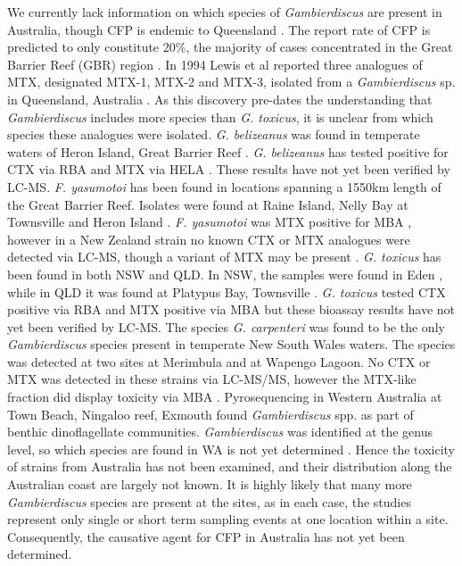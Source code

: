 \documentclass[12pt]{article}
\begin{document}
We currently lack information on which species of \emph{Gambierdiscus} are present in Australia, though CFP is endemic to Queensland \cite{lewis2006ciguatera}. The report rate of CFP is predicted to only constitute 20\%, the majority of cases concentrated in the Great Barrier Reef (GBR) region \cite{lewis2006ciguatera}.
In 1994 Lewis et al reported three analogues of MTX, designated MTX-1, MTX-2 and MTX-3, isolated from a \emph{Gambierdiscus} sp. in Queensland, Australia \cite{holmes1994purification}. As this discovery pre-dates the understanding that \emph{Gambierdiscus} includes more species than \emph{G. toxicus}, it is unclear from which species these analogues were isolated.  
\emph{G. belizeanus} was found in temperate waters of Heron Island, Great Barrier Reef  \cite{murray2014molecular}. \emph{G. belizeanus} has tested positive for CTX via RBA \cite{chinain2010growth} and MTX via HELA \cite{holland2013differences}. These results have not yet been verified by LC-MS.
\emph{F. yasumotoi} has been found in locations spanning a 1550km length of the Great Barrier Reef. Isolates were found at Raine Island, Nelly Bay at Townsville and Heron Island \cite{murray2014molecular}. \emph{F. yasumotoi} was MTX positive for MBA \cite{holmes1998gambierdiscus}, however in a New Zealand strain no known CTX or MTX analogues were detected via LC-MS, though a variant of MTX may be present \cite{rhodes2014gambierdiscus}.
\emph{G. toxicus} has been found in both NSW and QLD. In NSW, the samples were found in Eden \cite{hallegraeff2010algae}, while in QLD it was found at Platypus Bay, Townsville  \cite{hallegraeff2010algae}. \emph{G. toxicus} tested CTX positive via RBA \cite{chinain2010growth} and MTX positive via MBA \cite{chinain1999morphology} but these bioassay results have not yet been verified by LC-MS.
The species \emph{G. carpenteri} was found to be the only \emph{Gambierdiscus} species present in temperate New South Wales waters. The species was detected at two sites at Merimbula and at Wapengo Lagoon. No CTX or MTX was detected in these strains via LC-MS/MS, however the MTX-like fraction did display toxicity via MBA  \cite{kohli2014high}. 
Pyrosequencing in Western Australia at Town Beach, Ningaloo reef, Exmouth found \emph{Gambierdiscus} spp. as part of benthic dinoflagellate communities.  \emph{Gambierdiscus} was identified at the genus level, so which species are found in WA is not yet determined \cite{kohli2014cob}. 
Hence the toxicity of strains from Australia has not been examined, and their distribution along the Australian coast are largely not known. It is highly likely that many more \emph{Gambierdiscus} species are present at the sites, as in each case, the studies represent only single or short term sampling events at one location within a site. Consequently, the causative agent for CFP in Australia has not yet been determined. \\
\end{document}
